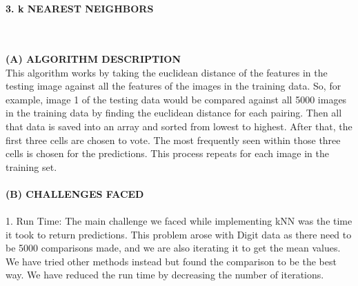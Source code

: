 \documentclass[10 pt]{report}   	%
\begin{document}
{\Large \textbf {\\ \\3. k NEAREST NEIGHBORS\\ }

\large {\\ \\\textbf {(A) ALGORITHM DESCRIPTION} \\ 

This algorithm works by taking the euclidean distance of the features in the testing image against all the features of the images in the training data. So, for example, image 1 of the testing data would be compared against all 5000 images in the training data by finding the euclidean distance for each pairing. 
Then all that data is saved into an array and sorted from lowest to highest. After that, the first three cells are chosen to vote. The most frequently seen within those three cells is chosen for the predictions. This process repeats for each image in the
training set. \\ \\ 
\textbf{(B) CHALLENGES FACED} \\ \\ 
1. Run Time: The main challenge we faced while implementing kNN was the time it took to return predictions. This problem arose with Digit data as there need to be 5000 comparisons made, and we are also iterating it to get the mean values. We have tried other methods instead but found the comparison to be the best way. We have reduced the run time by decreasing the number of iterations.\\ \\ 

}}
\end{document}
